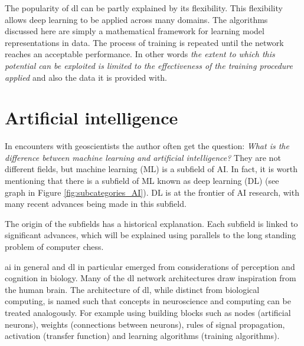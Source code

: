 
The popularity of \acrshort{dl} can be partly explained by its flexibility. This flexibility allows deep learning to be applied across many domains. The algorithms discussed here are simply a mathematical framework for learning model representations in data. The process of training is repeated until the network reaches an acceptable performance. In other words \textit{the extent to which this potential can be exploited is limited to the effectiveness of the training procedure applied} and also the data it is provided with. 

\section{Artificial intelligence}

%
In encounters with geoscientists the author often get the question: \textit{What is the difference between machine learning and artificial intelligence?} They are not different fields, but machine learning (ML) is a subfield of AI. In fact, it is worth mentioning that there is a subfield of ML known as deep learning (DL) (see graph in Figure \ref{fig:subcategories_AI}). DL is at the frontier of AI research, with many recent advances being made in this subfield. %

The origin of the subfields has a historical explanation. Each subfield is linked to significant advances, which will be explained using parallels to the long standing problem of computer chess. 

\acrfull{ai} in general and \acrfull{dl} in particular emerged from considerations of perception and cognition in biology. Many of the \acrfull{dl} network architectures draw inspiration from the human brain. The architecture of \acrfull{dl}, while distinct from biological computing, is named such that concepts in neuroscience and computing can be treated analogously. For example using building blocks such as nodes (artificial neurons), weights (connections between neurons), rules of signal propagation, activation (transfer function) and learning algorithms (training algorithms). %

